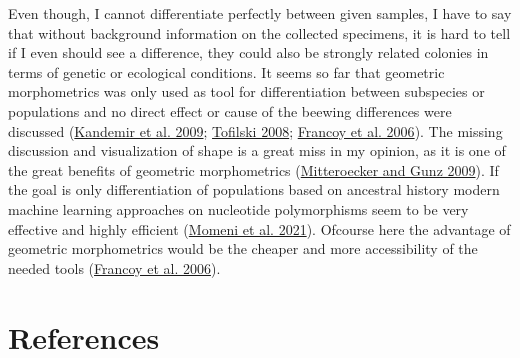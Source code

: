 \documentclass[
]{article}
\begin{document}
Even though, I cannot differentiate perfectly between given samples, I have to say that without background information on the collected specimens, it is hard to tell if I even should see a difference, they could also be strongly related colonies in terms of genetic or ecological conditions. It seems so far that geometric morphometrics was only used as tool for differentiation between subspecies or populations and no direct effect or cause of the beewing differences were discussed (\protect\hyperlink{ref-kandemir2009}{Kandemir et al. 2009}; \protect\hyperlink{ref-tofilski2008}{Tofilski 2008}; \protect\hyperlink{ref-francoy2006}{Francoy et al. 2006}). The missing discussion and visualization of shape is a great miss in my opinion, as it is one of the great benefits of geometric morphometrics (\protect\hyperlink{ref-mitteroecker2009}{Mitteroecker and Gunz 2009}). If the goal is only differentiation of populations based on ancestral history modern machine learning approaches on nucleotide polymorphisms seem to be very effective and highly efficient (\protect\hyperlink{ref-momeni2021}{Momeni et al. 2021}). Ofcourse here the advantage of geometric morphometrics would be the cheaper and more accessibility of the needed tools (\protect\hyperlink{ref-francoy2006}{Francoy et al. 2006}).

\hypertarget{references}{%
\section*{References}\label{references}}
\end{document}
